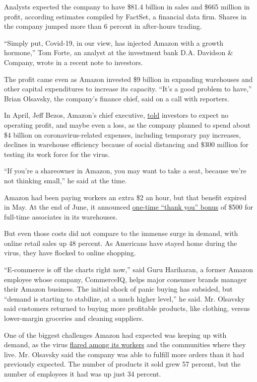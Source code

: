 Analysts expected the company to have \$81.4 billion in sales and \$665
million in profit, according estimates compiled by FactSet, a financial
data firm. Shares in the company jumped more than 6 percent in
after-hours trading.

``Simply put, Covid-19, in our view, has injected Amazon with a growth
hormone,'' Tom Forte, an analyst at the investment bank D.A. Davidson \&
Company, wrote in a recent note to investors.

The profit came even as Amazon invested \$9 billion in expanding
warehouses and other capital expenditures to increase its capacity.
``It's a good problem to have,'' Brian Olsavsky, the company's finance
chief, said on a call with reporters.

In April, Jeff Bezos, Amazon's chief executive,
\href{https://www.nytimes.com/2020/04/30/technology/amazon-stock-earnings-report.html}{told}
investors to expect no operating profit, and maybe even a loss, as the
company planned to spend about \$4 billion on coronavirus-related
expenses, including temporary pay increases, declines in warehouse
efficiency because of social distancing and \$300 million for testing
its work force for the virus.

``If you're a shareowner in Amazon, you may want to take a seat, because
we're not thinking small,'' he said at the time.

Amazon had been paying workers an extra \$2 an hour, but that benefit
expired in May. At the end of June, it announced
\href{https://blog.aboutamazon.com/operations/a-thank-you-bonus-for-amazon-front-line-employees-and-partners}{one-time
``thank you'' bonus} of \$500 for full-time associates in its
warehouses.

But even those costs did not compare to the immense surge in demand,
with online retail sales up 48 percent. As Americans have stayed home
during the virus, they have flocked to online shopping.

``E-commerce is off the charts right now,'' said Guru Hariharan, a
former Amazon employee whose company, CommerceIQ, helps major consumer
brands manager their Amazon business. The initial shock of panic buying
has subsided, but ``demand is starting to stabilize, at a much higher
level,'' he said. Mr. Olsavsky said customers returned to buying more
profitable products, like clothing, versus lower-margin groceries and
cleaning suppliers.

One of the biggest challenges Amazon had expected was keeping up with
demand, as the virus
\href{https://www.nytimes.com/2020/05/19/technology/amazon-coronavirus-workers.html}{flared
among its workers} and the communities where they live. Mr. Olsavsky
said the company was able to fulfill more orders than it had previously
expected. The number of products it sold grew 57 percent, but the number
of employees it had was up just 34 percent.

